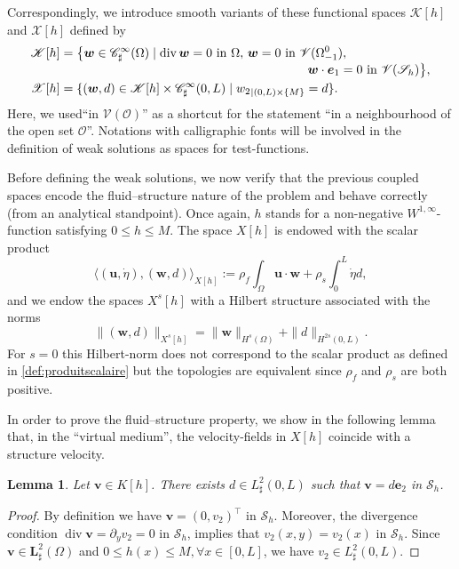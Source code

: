 \documentclass[JEP,XML,SOM,Unicode,NoFloatCountersInSection]{cedram}
\let\mathcal\mathscr
\newtheorem{lemma}[theorem]{Lemma}
\theoremstyle{remark}
\theoremstyle{definition}
\newcommand{\ug}{\boldsymbol{u}}
\newcommand{\vg}{\boldsymbol{v}}
\DeclareMathOperator{\DIV}{div}
\newcommand{\wg}{\boldsymbol{w}}
\newcommand{\BS}[1]{\boldsymbol{#1}}
\let\CM\Omega
\newcommand{\etap}{\dot{\eta}}
\begin{document}
Correspondingly, we introduce smooth variants of these functional spaces $\mathcal{K}[h]$ and $\mathcal{X}[h]$ defined by
\begin{align}
\mathcal{K}[h]&=\bigl\{\wg\in\mathcal{C}^{\infty}_{\sharp}(\CM)\mid \DIV{\wg}=0\text{ in }\CM,\,\wg=0\text{ in }\mathcal{V}(\Omega_{-1}^{0}),\\[-3pt]
&\hspace*{7cm}\wg\cdot\BS{e}_{1}=0\text{ in } \mathcal V(\mathcal{S}_{h})\bigl\},\notag\\
\mathcal{X}[h]&=\{(\wg,d)\in \mathcal{K}[h]\times \mathcal{C}^{\infty}_{\sharp}(0,L)\mid {w_{2}}_{|{(0, L)\times \{M\}}}=d\}.
\end{align}
Here, we used``in $\mathcal{V}(\mathcal O)$'' as a shortcut for the statement ``in a neighbourhood of the open set $\mathcal O$''.
Notations with calligraphic fonts will be involved in the definition of weak solutions as spaces for test-functions.

Before defining the weak solutions, we now verify that the previous coupled spaces encode
the fluid--structure nature of the problem and behave correctly (from an analytical standpoint).
Once again, $h$ stands for a non-negative $W^{1, \infty}$-function satisfying $0\leq h \leq M$.
The space $X[h]$ is endowed with the scalar product\vspace*{-3pt}
\begin{equation}
\label{def:produitscalaire}
\langle (\ug,\etap),(\wg,d)\rangle_{X[h]}:=\rho_{f}\int_{\CM}\ug\cdot\wg + \rho_{s}\int_{0}^{L}\etap d,\end{equation}
and we endow the spaces $X^s[h]$ with a Hilbert structure associated with the norms\vspace*{-3pt}\enlargethispage{.5\baselineskip}%
\[
\|(\wg,d)\|_{X^s[h]}= \|\wg\|_{H^s(\Omega)} + \|d\|_{H^{2s}(0,L)}.
\]
For $s=0$ this Hilbert-norm does not correspond to the scalar product as defined in \eqref{def:produitscalaire}
but the topologies are equivalent since $\rho_f$ and $\rho_s$ are both positive.

In order to prove the fluid--structure property, we show in the following lemma that,
in the ``virtual medium'', the velocity-fields in $X[h]$ coincide with a structure velocity.
\begin{lemma}Let $\vg \in K[h]$. There exists $d\in L_{\sharp}^{2}(0,L)$ such that $\vg=d\BS{e}_{2}$ in $\mathcal{S}_{h}$. \end{lemma}
\begin{proof}
By definition we have $\vg=(0,v_{2})^{\top}$ in $\mathcal{S}_{h}$. Moreover, the divergence condition
$\DIV{\vg}=\partial_yv_{2}=0\text{ in }\mathcal{S}_{h}$,
implies that $v_{2}(x,y)=v_{2}(x)$ in $\mathcal{S}_{h}$. Since $\vg\in \BS{L}^2_\sharp(\CM)$ and $0\leq h(x) \leq M, \forall x\in [0, L]$, we have $v_2\in L_\sharp^2(0, L)$.
\end{proof}
\end{document}
